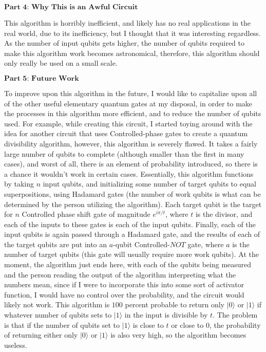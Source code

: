 \documentclass{article}
\begin{document}
\begin{center}
$\textbf{Part 4: Why This is an Awful Circuit}$
\end{center}
\newline\newline
This algorithm is horribly inefficient, and likely has no real applications in the real world, due to its inefficiency, but I thought that it was interesting regardless. As the number of input qubits gets higher, the number of qubits required to make this algorithm work becomes astronomical, therefore, this algorithm should only really be used on a small scale.
\newline\newline
\begin{center}
$\textbf{Part 5: Future Work}$
\end{center}
\newline\newline
To improve upon this algorithm in the future, I would like to capitalize upon all of the other useful elementary quantum gates at my disposal, in order to make the processes in this algorithm more efficient, and to reduce the number of qubits used. For example, while creating this circuit, I started toying around with the idea for another circuit that uses Controlled-phase gates to create a quantum divisibility algorithm, however, this algorithm is severely flawed. It takes a fairly large number of qubits to complete (although smaller than the first in many cases), and worst of all, there is an element of probability introduced, so there is a chance it wouldn't work in certain cases. Essentially, this algorithm functions by taking $n$ input qubits, and initializing some number of target qubits to equal superpositions, using Hadamard gates (the number of work qubits is what can be determined by the person utilizing the algorithm). Each target qubit is the target for $n$ Controlled phase shift gate of magnitude $e^{i\pi/t}$, where $t$ is the divisor, and each of the inputs to these gates is each of the input qubits. Finally, each of the input qubits is again passed through a Hadamard gate, and the results of each of the target qubits are put into an $a$-qubit Controlled-$NOT$ gate, where $a$ is the number of target qubits (this gate will usually require more work qubits). At the moment, the algorithm just ends here, with each of the qubits being measured and the person reading the output of the algorithm interpreting what the numbers mean, since if I were to incorporate this into some sort of activator function, I would have no control over the probability, and the circuit would likely not work. This algorithm is $100$ percent probable to return only $|0\rangle$ or $|1\rangle$ if whatever number of qubits sets to $|1\rangle$ in the input is divisible by $t$. The problem is that if the number of qubits set to $|1\rangle$ is close to $t$ or close to $0$, the probability of returning either only $|0\rangle$ or $|1\rangle$ is also very high, so the algorithm becomes useless.
\end{document}
